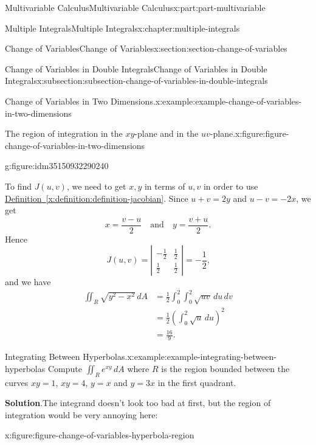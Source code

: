 \documentclass[twoside,10pt,]{tufte-book}
\newcommand{\blocktitlefont}{\relax}
\newcommand{\xreffont}{\relax}
\numberwithin{equation}{part}
\newcommand{\qq}[1]{\quad\text{#1}\quad}
\newcommand{\amp}{&}
\begin{document}
\begin{partptx}{Multivariable Calculus}{}{Multivariable Calculus}{}{}{x:part:part-multivariable}
\begin{chapterptx}{Multiple Integrals}{}{Multiple Integrals}{}{}{x:chapter:multiple-integrals}
\begin{sectionptx}{Change of Variables}{}{Change of Variables}{}{}{x:section:section-change-of-variables}
\begin{subsectionptx}{Change of Variables in Double Integrals}{}{Change of Variables in Double Integrals}{}{}{x:subsection:subsection-change-of-variables-in-double-integrals}
\begin{example}{Change of Variables in Two Dimensions.}{x:example:example-change-of-variables-in-two-dimensions}
\begin{figureptx}{The region of integration in the \(xy\)-plane and in the \(uv\)-plane.}{x:figure:figure-change-of-variables-in-two-dimensions}{}
\begin{sidebyside}{2}{0}{0}{0}
\begin{sbspanel}{0.5}
\begin{subfigureptx}{}{g:figure:idm35150932290240}{}
{
}%
\tcblower
\end{subfigureptx}%
\end{sbspanel}%
\end{sidebyside}%
\tcblower
\end{figureptx}%
To find \(J(u,v)\), we need to get \(x,y\) in terms of \(u,v\) in order to use \hyperref[x:definition:definition-jacobian]{Definition~{\xreffont\ref{x:definition:definition-jacobian}}}. Since \(u + v = 2y\) and \(u - v = -2x\), we get%
\begin{equation*}
x = \frac{v - u}{2} \qq{and} y = \frac{v + u}{2}\text{.}
\end{equation*}
Hence%
\begin{equation*}
J(u,v) = \left|\begin{array}{cc}-\frac{1}{2} \amp \frac{1}{2} \\ \frac{1}{2} \amp \frac{1}{2}\end{array}\right| = -\frac{1}{2}\text{,}
\end{equation*}
and we have%
\begin{align*}
\iint_{R}\sqrt{y^{2} - x^{2}}\,dA \amp = \frac{1}{2}\int_{0}^{2}\int_{0}^{2}\sqrt{uv}\,du\,dv \\
\amp = \frac{1}{2}\left(\int_{0}^{2}\sqrt{u}\,du\right)^{2} \\
\amp = \frac{16}{9} \text{.}
\end{align*}
%
\end{example}
\begin{example}{Integrating Between Hyperbolas.}{x:example:example-integrating-between-hyperbolas}%
Compute \(\iint_{R}e^{xy}\,dA\) where \(R\) is the region bounded between the curves \(xy = 1\), \(xy = 4\), \(y = x\) and \(y = 3x\) in the first quadrant.%
\par\smallskip%
\noindent\textbf{\blocktitlefont Solution}.\hypertarget{g:solution:idm35150932281664}{}\quad{}The integrand doesn't look too bad at first, but the region of integration would be very annoying here:%
\begin{figureptx}{}{x:figure:figure-change-of-variables-hyperbola-region}{}%

\end{figureptx}
\end{example}
\end{subsectionptx}
\end{sectionptx}
\end{chapterptx}
\end{partptx}
\end{document}
